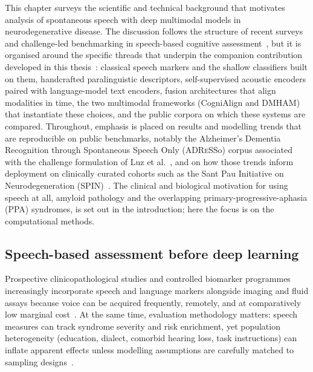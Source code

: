 This chapter surveys the scientific and technical background that motivates analysis of spontaneous speech with deep multimodal models in neurodegenerative disease.
The discussion follows the structure of recent surveys and challenge-led benchmarking in speech-based cognitive assessment~\cite{ding2024speechsurvey}, but it is organised around the specific threads that underpin the companion contribution developed in this thesis~\cite{esteve2025speechadppa}: classical speech markers and the shallow classifiers built on them, handcrafted paralinguistic descriptors, self-supervised acoustic encoders paired with language-model text encoders, fusion architectures that align modalities in time, the two multimodal frameworks (CogniAlign and DMHAM) that instantiate these choices, and the public corpora on which these systems are compared.
Throughout, emphasis is placed on results and modelling trends that are reproducible on public benchmarks, notably the Alzheimer's Dementia Recognition through Spontaneous Speech Only (\textsc{ADReSS}o) corpus associated with the challenge formulation of Luz et al.~\cite{luz2021adresso}, and on how those trends inform deployment on clinically curated cohorts such as the Sant Pau Initiative on Neurodegeneration (SPIN)~\cite{alcolea2019spin}.
The clinical and biological motivation for using speech at all, amyloid pathology and the overlapping primary-progressive-aphasia (PPA) syndromes, is set out in the introduction; here the focus is on the computational methods.

\subsection{Speech-based assessment before deep learning}

Prospective clinicopathological studies and controlled biomarker programmes increasingly incorporate speech and language markers alongside imaging and fluid assays because voice can be acquired frequently, remotely, and at comparatively low marginal cost~\cite{rezaii2025voiceprints}.
At the same time, evaluation methodology matters: speech measures can track syndrome severity and risk enrichment, yet population heterogeneity (education, dialect, comorbid hearing loss, task instructions) can inflate apparent effects unless modelling assumptions are carefully matched to sampling designs~\cite{lima2025communicationsmedicine}.

